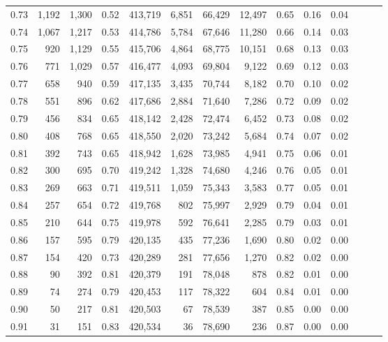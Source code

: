 \begin{tabular}{rrrrrrrrrrrrrr}
0.73 &  1,192 &  1,300 &  0.52 &  413,719 &    6,851 &  66,429 &  12,497 &  0.65 &  0.16 &      0.04 \\
0.74 &  1,067 &  1,217 &  0.53 &  414,786 &    5,784 &  67,646 &  11,280 &  0.66 &  0.14 &      0.03 \\
0.75 &    920 &  1,129 &  0.55 &  415,706 &    4,864 &  68,775 &  10,151 &  0.68 &  0.13 &      0.03 \\
0.76 &    771 &  1,029 &  0.57 &  416,477 &    4,093 &  69,804 &   9,122 &  0.69 &  0.12 &      0.03 \\
0.77 &    658 &    940 &  0.59 &  417,135 &    3,435 &  70,744 &   8,182 &  0.70 &  0.10 &      0.02 \\
0.78 &    551 &    896 &  0.62 &  417,686 &    2,884 &  71,640 &   7,286 &  0.72 &  0.09 &      0.02 \\
0.79 &    456 &    834 &  0.65 &  418,142 &    2,428 &  72,474 &   6,452 &  0.73 &  0.08 &      0.02 \\
0.80 &    408 &    768 &  0.65 &  418,550 &    2,020 &  73,242 &   5,684 &  0.74 &  0.07 &      0.02 \\
0.81 &    392 &    743 &  0.65 &  418,942 &    1,628 &  73,985 &   4,941 &  0.75 &  0.06 &      0.01 \\
0.82 &    300 &    695 &  0.70 &  419,242 &    1,328 &  74,680 &   4,246 &  0.76 &  0.05 &      0.01 \\
0.83 &    269 &    663 &  0.71 &  419,511 &    1,059 &  75,343 &   3,583 &  0.77 &  0.05 &      0.01 \\
0.84 &    257 &    654 &  0.72 &  419,768 &      802 &  75,997 &   2,929 &  0.79 &  0.04 &      0.01 \\
0.85 &    210 &    644 &  0.75 &  419,978 &      592 &  76,641 &   2,285 &  0.79 &  0.03 &      0.01 \\
0.86 &    157 &    595 &  0.79 &  420,135 &      435 &  77,236 &   1,690 &  0.80 &  0.02 &      0.00 \\
0.87 &    154 &    420 &  0.73 &  420,289 &      281 &  77,656 &   1,270 &  0.82 &  0.02 &      0.00 \\
0.88 &     90 &    392 &  0.81 &  420,379 &      191 &  78,048 &     878 &  0.82 &  0.01 &      0.00 \\
0.89 &     74 &    274 &  0.79 &  420,453 &      117 &  78,322 &     604 &  0.84 &  0.01 &      0.00 \\
0.90 &     50 &    217 &  0.81 &  420,503 &       67 &  78,539 &     387 &  0.85 &  0.00 &      0.00 \\
0.91 &     31 &    151 &  0.83 &  420,534 &       36 &  78,690 &     236 &  0.87 &  0.00 &      0.00 \\

\end{tabular}

